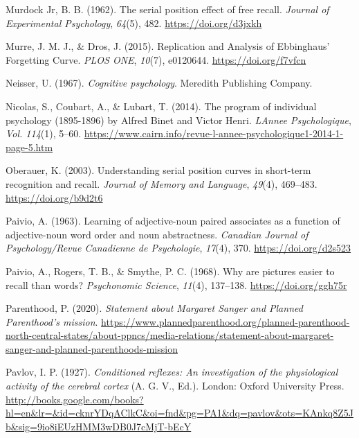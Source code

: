 \documentclass[
  oneside,
  12pt]{crumpbook}
\newlength{\cslhangindent}
\newlength{\cslentryspacingunit} %
\newenvironment{CSLReferences}[2] %
 {%
  \setlength{\parindent}{0pt}
  \ifodd #1
  \let\oldpar\par
  \def\par{\hangindent=\cslhangindent\oldpar}
  \fi
  \setlength{\parskip}{#2\cslentryspacingunit}
 }%
 {}
\begin{document}
\begin{CSLReferences}{1}{0}
\leavevmode{}%
Murdock Jr, B. B. (1962). The serial position effect of free recall. \emph{Journal of Experimental Psychology}, \emph{64}(5), 482. \url{https://doi.org/d3jxkh}

\leavevmode{}%
Murre, J. M. J., \& Dros, J. (2015). Replication and {Analysis} of {Ebbinghaus}' {Forgetting Curve}. \emph{PLOS ONE}, \emph{10}(7), e0120644. \url{https://doi.org/f7vfcn}

\leavevmode{}%
Neisser, U. (1967). \emph{Cognitive psychology}. {Meredith Publishing Company}.

\leavevmode{}%
Nicolas, S., Coubart, A., \& Lubart, T. (2014). The program of individual psychology (1895-1896) by {Alfred Binet} and {Victor Henri}. \emph{LAnnee Psychologique}, \emph{Vol. 114}(1), 5--60. \url{https://www.cairn.info/revue-l-annee-psychologique1-2014-1-page-5.htm}

\leavevmode{}%
Oberauer, K. (2003). Understanding serial position curves in short-term recognition and recall. \emph{Journal of Memory and Language}, \emph{49}(4), 469--483. \url{https://doi.org/b9d2t6}

\leavevmode{}%
Paivio, A. (1963). Learning of adjective-noun paired associates as a function of adjective-noun word order and noun abstractness. \emph{Canadian Journal of Psychology/Revue Canadienne de Psychologie}, \emph{17}(4), 370. \url{https://doi.org/d2s523}

\leavevmode{}%
Paivio, A., Rogers, T. B., \& Smythe, P. C. (1968). Why are pictures easier to recall than words? \emph{Psychonomic Science}, \emph{11}(4), 137--138. \url{https://doi.org/ggh75r}

\leavevmode{}%
Parenthood, P. (2020). \emph{Statement about {Margaret Sanger} and {Planned Parenthood}'s mission}. \url{https://www.plannedparenthood.org/planned-parenthood-north-central-states/about-ppncs/media-relations/statement-about-margaret-sanger-and-planned-parenthoods-mission}

\leavevmode{}%
Pavlov, I. P. (1927). \emph{Conditioned reflexes: {An} investigation of the physiological activity of the cerebral cortex} (A. G. V., Ed.). {London: Oxford University Press}. \url{http://books.google.com/books?hl=en\&lr=\&id=cknrYDqAClkC\&oi=fnd\&pg=PA1\&dq=pavlov\&ots=KAnkq8Z5Jb\&sig=9io8iEUzHMM3wDB0J7cMjT-bEcY}


\end{CSLReferences}
\end{document}
